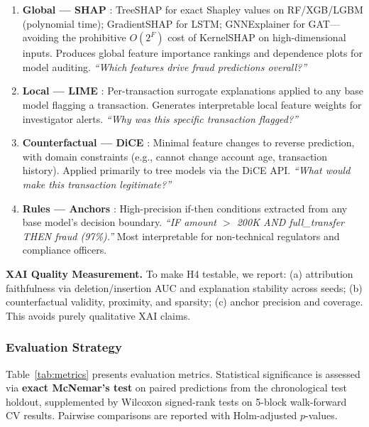 \documentclass[10pt,a4paper,twocolumn]{article}
\begin{document}
\begin{enumerate}
    \item \textbf{Global --- SHAP} \cite{lundberg2017}: TreeSHAP for exact Shapley values on RF/XGB/LGBM (polynomial time); GradientSHAP for LSTM; GNNExplainer for GAT---avoiding the prohibitive $O(2^F)$ cost of KernelSHAP on high-dimensional inputs. Produces global feature importance rankings and dependence plots for model auditing. \emph{``Which features drive fraud predictions overall?''}
    \item \textbf{Local --- LIME} \cite{ribeiro2016}: Per-transaction surrogate explanations applied to any base model flagging a transaction. Generates interpretable local feature weights for investigator alerts. \emph{``Why was this specific transaction flagged?''}
    \item \textbf{Counterfactual --- DiCE} \cite{mothilal2020}: Minimal feature changes to reverse prediction, with domain constraints (e.g., cannot change account age, transaction history). Applied primarily to tree models via the DiCE API. \emph{``What would make this transaction legitimate?''}
    \item \textbf{Rules --- Anchors} \cite{ribeiro2018}: High-precision if-then conditions extracted from any base model's decision boundary. \emph{``IF amount $>$ 200K AND full\_transfer THEN fraud (97\%).''} Most interpretable for non-technical regulators and compliance officers.
\end{enumerate}

\textbf{XAI Quality Measurement.} To make H4 testable, we report: (a) attribution faithfulness via deletion/insertion AUC and explanation stability across seeds; (b) counterfactual validity, proximity, and sparsity; (c) anchor precision and coverage. This avoids purely qualitative XAI claims.

\subsubsection{Evaluation Strategy}

Table~\ref{tab:metrics} presents evaluation metrics. Statistical significance is assessed via \textbf{exact McNemar's test} on paired predictions from the chronological test holdout, supplemented by Wilcoxon signed-rank tests on 5-block walk-forward CV results. Pairwise comparisons are reported with Holm-adjusted $p$-values.
\end{document}
